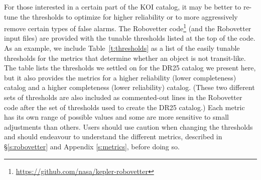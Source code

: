 For those interested in a certain part of the KOI catalog, it may be better to re-tune the thresholds to optimize for higher reliability or to more aggressively remove certain types of false alarms.   The Robovetter code\footnote{\url{https://github.com/nasa/kepler-robovetter}} (and the Robovetter input files) are provided with the tunable thresholds listed at the top of the code.  As an example, we include Table~\ref{t:thresholds} as a list of the easily tunable thresholds for the metrics that determine whether an object is not transit-like.  The table lists the thresholds we settled on for the DR25 catalog we present here, but it also provides the metrics for a higher reliability (lower completeness) catalog and a higher completeness (lower reliability) catalog. (These two different sets of thresholds are also included as commented-out lines in the Robovetter code after the set of thresholds used to create the DR25 catalog.) Each metric has its own range of possible values and some are more sensitive to small adjustments than others.  Users should use caution when changing the thresholds and should endeavour to understand the different metrics, described in \S\ref{s:robovetter} and Appendix \ref{s:metrics}, before doing so.




